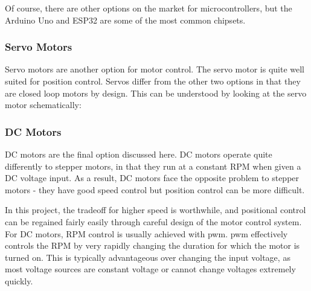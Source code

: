 Of course, there are other options on the market for microcontrollers, but the Arduino Uno and ESP32 are some of the most common chipsets.

\subsubsection{Servo Motors}
Servo motors are another option for motor control. The servo motor is quite well suited for position control. Servos differ from the other two options in that they are closed loop motors by design. This can be understood by looking at the servo motor schematically:


\subsubsection{DC Motors}
DC motors are the final option discussed here. DC motors operate quite differently to stepper motors, in that they run at a constant RPM when given a DC voltage input. As a result, DC motors face the opposite problem to stepper motors - they have good speed control but position control can be more difficult.

In this project, the tradeoff for higher speed is worthwhile, and positional control can be regained fairly easily through careful design of the motor control system. For DC motors, RPM control is usually achieved with \gls{pwm}. \Gls{pwm} effectively controls the RPM by very rapidly changing the duration for which the motor is turned on. This is typically advantageous over changing the input voltage, as most voltage sources are constant voltage or cannot change voltages extremely quickly.

